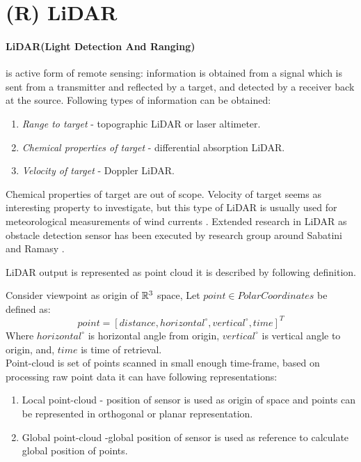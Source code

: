 \section{(R) LiDAR}\label{sec:LiDARStateOfArt}
\noindent \paragraph{LiDAR(Light Detection And Ranging)} is active form of remote sensing: information is obtained from a signal which is sent from a transmitter and reflected by a target, and detected by a receiver back at the source. Following types of information can be obtained:
\begin{enumerate}
\item \textit{Range to target} - topographic LiDAR or laser altimeter.
\item \textit{Chemical properties of target} - differential absorption LiDAR.
\item \textit{Velocity of target} - Doppler LiDAR.
\end{enumerate}

\noindent Chemical properties of target are out of scope. Velocity of  target seems as interesting property to investigate, but this type of LiDAR is usually used for meteorological measurements of wind currents \cite{martin2011meteorological}. Extended research in LiDAR as obstacle detection sensor has been executed by research group around Sabatini \cite{sabatini2014lidar} and Ramasy \cite{ramasamy2016lidar}. 

LiDAR output is represented as point cloud it is described by following definition.
\begin{definition}
Consider viewpoint as origin of $\mathbb{R}^3$ space,  Let  $point \in Polar Coordinates$ be defined as:
    \begin{equation}
        point = [ distance, horizontal^\circ, vertical^\circ, time ]^T
    \end{equation}
    Where $horizontal^\circ$ is horizontal angle from origin, $vertical^\circ$ is vertical angle to origin, and, $time$ is time of retrieval.\\

    \noindent Point-cloud is set of points scanned in small enough time-frame, based on processing raw point data it can have following representations:
    
    \begin{enumerate}
        \item Local point-cloud - position of sensor is used as origin of space and points can be represented in orthogonal or planar representation. 
        
        \item Global point-cloud -global position of sensor is used as reference to calculate global position of points.
    \end{enumerate}
\end{definition}

